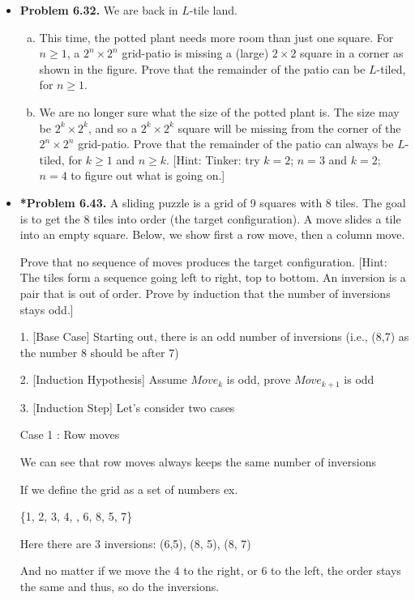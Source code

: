 \documentclass[11pt]{article}
\begin{document}
\begin{itemize}
\vspace{0.1in}

\item \textbf{Problem 6.32.}
  We are back in $L$-tile land.
  \begin{enumerate}[(a)]
  \item This time, the potted plant needs more room than just one square.
    For $n\ge 1$, a $2^n\times 2^n$ grid-patio is missing a (large) $2\times 2$ square
    in a corner as shown in the figure.
    Prove that the remainder of the patio can be $L$-tiled, for $n\ge 1$.
  \item We are no longer sure what the size of the potted plant is.
    The size may be $2^k\times 2^k$, and so a $2^k\times 2^k$ square
    will be missing from the corner of the $2^n\times 2^n$ grid-patio.
    Prove that the remainder of the patio can always be $L$-tiled,
    for $k\ge 1$ and $n\ge k$.
    [Hint: Tinker: try $k=2$; $n=3$ and $k=2$; $n=4$ to figure out what is going on.]
  \end{enumerate}

\newpage

\item \textbf{*Problem 6.43.}
  A sliding puzzle is a grid of 9 squares with 8 tiles.
  The goal is to get the 8 tiles into order (the target configuration).
  A move slides a tile into an empty square.
  Below, we show first a row move, then a column move.

  Prove that no sequence of moves produces the target configuration.
  [Hint: The tiles form a sequence going left to right, top to bottom.
  An inversion is a pair that is out of order.
  Prove by induction that the number of inversions stays odd.]

  1. [Base Case] Starting out, there is an odd number of inversions (i.e., (8,7) as the number 8 should be after 7)

  2. [Induction Hypothesis] Assume $Move_k$ is odd, prove $Move_{k+1}$ is odd

  3. [Induction Step] Let's consider two cases

  Case 1 : Row moves

  We can see that row moves always keeps the same number of inversions

  If we define the grid as a set of numbers ex. 
  
  \{1, 2, 3, 4, \textunderscore, 6, 8, 5, 7\}

  Here there are 3 inversions: (6,5), (8, 5), (8, 7)

  And no matter if we move the 4 to the right, or 6 to the left, the order stays the same
  and thus, so do the inversions.


\end{itemize}
\end{document}
